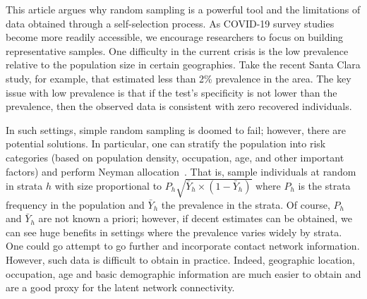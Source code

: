 \documentclass[aoas]{amsart}
\begin{document}
This article argues why random sampling is a powerful tool and the limitations of data obtained through a self-selection process.  As COVID-19 survey studies become more readily accessible, we encourage researchers to focus on building representative samples.  One difficulty in the current crisis is the low prevalence relative to the population size in certain geographies.  Take the recent Santa Clara study, for example, that estimated less than 2\% prevalence in the area.  The key issue with low prevalence is that if the test's specificity is not lower than the prevalence, then the observed data is consistent with zero recovered individuals.

In such settings, simple random sampling is doomed to fail; however, there are potential solutions.  In particular, one can stratify the population into risk categories (based on population density, occupation, age, and other important factors) and perform Neyman allocation~\citep{Cochran77}.  That is, sample individuals at random in strata $h$ with size proportional to $P_h \sqrt{\bar Y_h \times (1-\bar Y_h)}$ where $P_h$ is the strata frequency in the population and $\bar Y_h$ the prevalence in the strata. Of course, $P_h$ and $\bar Y_h$ are not known a priori; however, if decent estimates can be obtained, we can see huge benefits in settings where the prevalence varies widely by strata. One could go attempt to go further and incorporate contact network information.  However, such data is difficult to obtain in practice.  Indeed, geographic location, occupation, age and basic demographic information are much easier to obtain and are a good proxy for the latent network connectivity.

\end{document}
